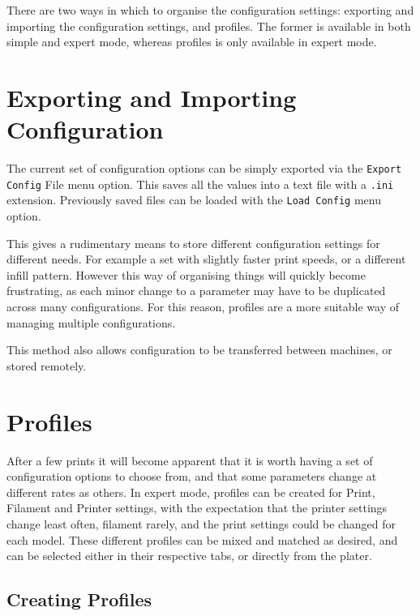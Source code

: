 
There are two ways in which to organise the configuration settings: exporting and importing the configuration settings, and profiles.  The former is available in both simple and expert mode, whereas profiles is only available in expert mode.

\section{Exporting and Importing Configuration} %
\label{sub:exporting_and_importing_configuration}

The current set of configuration options can be simply exported via the \texttt{Export Config} File menu option. This saves all the values into a text file with a \texttt{.ini} extension.  Previously saved files can be loaded with the \texttt{Load Config} menu option.

This gives a rudimentary means to store different configuration settings for different needs.  For example a set with slightly faster print speeds, or a different infill pattern.  However this way of organising things will quickly become frustrating, as each minor change to a parameter may have to be duplicated across many configurations.  For this reason, profiles are a more suitable way of managing multiple configurations.

This method also allows configuration to be transferred between machines, or stored remotely.



\section{Profiles} %
\label{sec:profiles}

After a few prints it will become apparent that it is worth having a set of configuration options to choose from, and that some parameters change at different rates as others.  In expert mode, profiles can be created for Print, Filament and Printer settings, with the expectation that the printer settings change least often, filament rarely, and the print settings could be changed for each model.  These different profiles can be mixed and matched as desired, and can be selected either in their respective tabs, or directly from the plater.

\subsection{Creating Profiles} %
\label{sub:creating_profiles}

